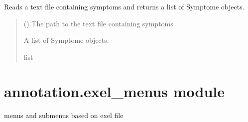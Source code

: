 \documentclass[letterpaper,10pt,english]{sphinxmanual}
\begin{document}
\begin{fulllineitems}
\label{\detokenize{annotation:annotation.load_symptomes.read_symptoms}}
\pysigstartsignatures
{}
\pysigstopsignatures
\sphinxAtStartPar
Reads a text file containing symptoms and returns a list of Symptome objects.
\begin{quote}\begin{description}
\sphinxAtStartPar
{} () \textendash{} The path to the text file containing symptoms.

\sphinxAtStartPar
A list of Symptome objects.

\sphinxAtStartPar
list

\end{description}\end{quote}

\end{fulllineitems}



\section{annotation.exel\_menus module}
\label{\detokenize{annotation:module-annotation.exel_menus}}\label{\detokenize{annotation:annotation-exel-menus-module}}
\sphinxAtStartPar
menus and submenus based on exel file
\end{document}
